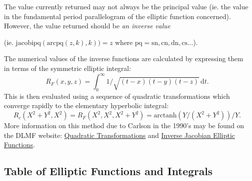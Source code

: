 The value currently returned may not always be the principal value
(ie. the value in the fundamental period parallelogram of the elliptic
function concerned). However, the value returned should be \emph
{an inverse value}

(ie. $\mathrm{jacobipq}(\mathrm{arcpq}(z,k),k)) = z$ where
$\mathrm{pq} = \mathrm{sn, cn, dn, cs} \ldots $).

The numerical values of the inverse functions are calculated by
expressing them in terms of the symmetric elliptic integral:
\[ R_F(x,y,z)=\int_0^\infty 1/\sqrt{(t-x)(t-y)(t-z)}\,\mathrm{d}t. \]
This is then evaluated using a sequence of quadratic transformations 
which converge rapidly to the elementary hyperbolic integral:
\[R_c(X^2+Y^2,X^2) = R_F(X^2,X^2,X^2+Y^2) = \mathrm{arctanh}
(Y/(X^2+Y^2))/Y.\]
More information on this method due to Carlson in the 1990's
may be found on the DLMF website:
\href{https://dlmf.nist.gov/19.36#ii}{Quadratic Transformations}
and \href{https://dlmf.nist.gov/19.25#v}{Inverse Jacobian
Elliptic Functions}.

\subsection{Table of Elliptic Functions and Integrals}
\hypertarget{ELLIPFNTAB}{}

